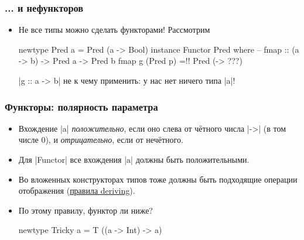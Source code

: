 \documentclass[11pt]{beamer}
\begin{document}
\begin{frame}[fragile]
  \frametitle{... и нефункторов}
  \begin{itemize}
    \item Не все типы можно сделать функторами! Рассмотрим
          \begin{haskell}
            newtype Pred a = Pred (a -> Bool)
            instance Functor Pred where 
              -- fmap :: (a -> b) -> Pred a -> Pred b
              fmap g (Pred p) =!\pause! Pred (\x -> ???)
          \end{haskell}
          \pause \haskinline|g :: a -> b| не к чему применить: у нас нет ничего типа \haskinline|a|!
  \end{itemize}
\end{frame}

\begin{frame}[fragile]
  \frametitle{Функторы: полярность параметра}
  \begin{itemize}
    \item Вхождение \haskinline|a| \emph{положительно}, если оно слева от чётного числа \haskinline|->| (в том числе 0), и \emph{отрицательно}, если от нечётного.
    \item Для \haskinline|Functor| все вхождения \haskinline|a| должны быть положительными.
    \item Во вложенных конструкторах типов тоже должны быть подходящие операции отображения (\href{https://downloads.haskell.org/~ghc/latest/docs/html/users_guide/exts/deriving_extra.html#deriving-functor-instances}{правила deriving}).
          \pause
    \item По этому правилу, функтор ли ниже?
          \begin{haskell}
            newtype Tricky a = T ((a -> Int) -> a)
          \end{haskell}
  \end{itemize}
\end{frame}
\end{document}
